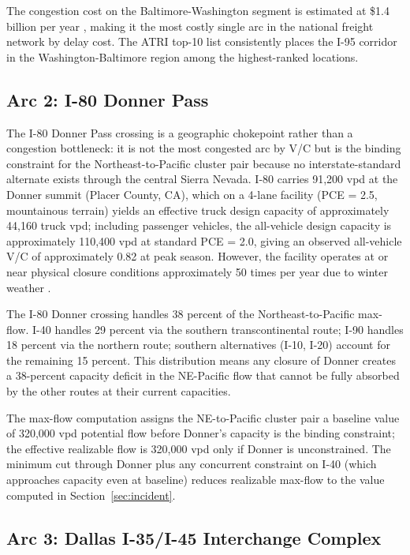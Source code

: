The congestion cost on the Baltimore-Washington segment is estimated at \$1.4 billion per year \citep{ATRI_costs2024}, making it the most costly single arc in the national freight network by delay cost. The ATRI top-10 list consistently places the I-95 corridor in the Washington-Baltimore region among the highest-ranked locations.

\subsection{Arc 2: I-80 Donner Pass}

The I-80 Donner Pass crossing is a geographic chokepoint rather than a congestion bottleneck: it is not the most congested arc by V/C but is the binding constraint for the Northeast-to-Pacific cluster pair because no interstate-standard alternate exists through the central Sierra Nevada. I-80 carries 91,200 vpd at the Donner summit (Placer County, CA), which on a 4-lane facility (PCE = 2.5, mountainous terrain) yields an effective truck design capacity of approximately 44,160 truck vpd; including passenger vehicles, the all-vehicle design capacity is approximately 110,400 vpd at standard PCE = 2.0, giving an observed all-vehicle V/C of approximately 0.82 at peak season. However, the facility operates at or near physical closure conditions approximately 50 times per year due to winter weather \citep{ROUTE_C1}.

The I-80 Donner crossing handles 38 percent of the Northeast-to-Pacific max-flow. I-40 handles 29 percent via the southern transcontinental route; I-90 handles 18 percent via the northern route; southern alternatives (I-10, I-20) account for the remaining 15 percent. This distribution means any closure of Donner creates a 38-percent capacity deficit in the NE-Pacific flow that cannot be fully absorbed by the other routes at their current capacities.

The max-flow computation assigns the NE-to-Pacific cluster pair a baseline value of 320,000 vpd potential flow before Donner's capacity is the binding constraint; the effective realizable flow is 320,000 vpd only if Donner is unconstrained. The minimum cut through Donner plus any concurrent constraint on I-40 (which approaches capacity even at baseline) reduces realizable max-flow to the value computed in Section~\ref{sec:incident}.

\subsection{Arc 3: Dallas I-35/I-45 Interchange Complex}

